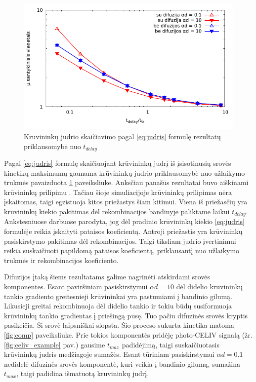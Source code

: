 \begin{figure}[htb]
  \centering
	\includegraphics{./media/pdf/log_mobility.pdf}
  \caption{Krūvininkų judrio skaičiavimo pagal \eqref{eq:judris} formulę rezultatų priklausomybė nuo $t_{delay}$}
  \label{fig:mobility}
\end{figure}

Pagal \eqref{eq:judris} formulę skaičiuojant krūvininkų judrį iš įsisotinusių srovės kinetikų maksimumų gaunama krūvininkų judrio priklausomybė nuo užlaikymo trukmės pavaizduota \ref{fig:mobility} paveiksliuke. Anksčiau panašūs rezultatai buvo aiškinami krūvininkų prilipimu \cite{juška:2004290}. Tačiau šioje simuliacijoje krūvininkų prilipimas nėra įskaitomas, taigi egzistuoja kitos priežastys šiam kitimui. Viena iš priežasčių yra krūvininkų kiekio pakitimas dėl rekombinacijos bandinyje paliktame laikui $t_{delay}$. Ankstesniuose darbuose \cite{juška:155202} parodyta, jog dėl pradinio krūvininkų kiekio \eqref{eq:judris} formulėje reikia įskaityti pataisos koeficientą. Antroji priežastis yra krūvininkų pasiskirstymo pakitimas dėl rekombinacijos. Taigi tiksliam judrio įvertinimui reikia suskaičiuoti papildomą pataisos koeficientą, priklausantį nuo užlaikymo trukmės ir rekombinacijos koeficiento.

Difuzijos įtaką šiems rezultatams galime nagrinėti atskirdami srovės komponentes. Esant paviršiniam pasiskirstymui $\alpha d = 10$ dėl didelio krūvininkų tankio gradiento greitesnieji krūvininkai yra pastumiami į bandinio gilumą. Likusieji greitai rekombinuoja dėl didelio tankio ir tokiu būdų susiformuoja krūvininkų tankio gradientas į priešingą pusę. Tuo pačiu difuzinės srovės kryptis pasikeičia. Ši srovė laipsniškai slopsta. Šio proceso sukurta kinetika matoma \ref{fig:comp} paveiksliuke. Prie tokios komponentės pridėję photo-CELIV signalą (žr. \ref{fig:celiv_example} pav.) gausime $t_{max}$ padidėjimą, taigi suskaičiuotasis krūvininkų judris medžiagoje sumažės. Esant tūriniam pasiskirstymui $\alpha d = 0.1$ nedidelė difuzinės srovės komponentė, kuri veikia į bandinio gilumą, sumažina $t_{max}$, taigi padidina išmatuotą kruvininkų judrį.
